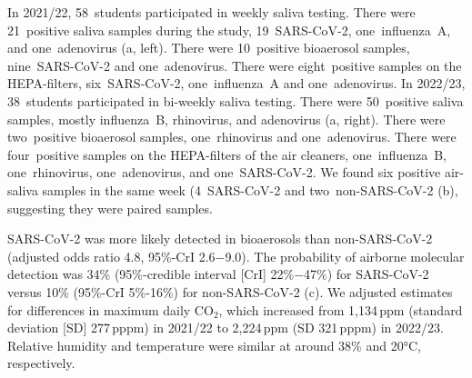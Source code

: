 \documentclass[fleqn,11pt]{wlscirep}
\begin{document}
In 2021/22, 58~students participated in weekly saliva testing. There were 21~positive saliva samples during the study, 19~SARS-CoV-2, one~influenza~A, and one~adenovirus (a, left). There were 10~positive bioaerosol samples, nine~SARS-CoV-2 and one~adenovirus. There were eight~positive samples on the HEPA-filters, six~SARS-CoV-2, one~influenza~A and one~adenovirus. In 2022/23, 38~students participated in bi-weekly saliva testing. There were 50~positive saliva samples, mostly influenza~B, rhinovirus, and adenovirus (a, right). There were two~positive bioaerosol samples, one~rhinovirus and one~adenovirus. There were four~positive samples on the HEPA-filters of the air cleaners, one~influenza~B, one~rhinovirus, one~adenovirus, and one~SARS-CoV-2. We found six positive air-saliva samples in the same week (4~SARS-CoV-2 and two~non-SARS-CoV-2 (b), suggesting they were paired samples. 

SARS-CoV-2 was more likely detected in bioaerosols than non-SARS-CoV-2 (adjusted odds ratio 4.8, 95\%-CrI 2.6$-$9.0). The probability of airborne molecular detection was 34\% (95\%-credible interval [CrI] 22\%$-$47\%) for SARS-CoV-2 versus 10\% (95\%-CrI 5\%-16\%) for non-SARS-CoV-2 (c). We adjusted estimates for differences in maximum daily CO$_2$, which increased from 1,134\,ppm (standard deviation [SD] 277\,pppm) in 2021/22 to 2,224\,ppm (SD 321\,pppm) in 2022/23. Relative humidity and temperature were similar at around 38\% and 20°C, respectively. 
\end{document}
